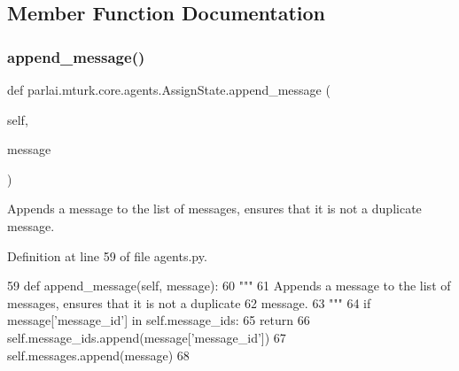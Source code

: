 \subsection{Member Function Documentation}
\mbox{\label{classparlai_1_1mturk_1_1core_1_1agents_1_1AssignState_a655ebb0e19f6a1b66416848bc2abca27}} 
\subsubsection{\texorpdfstring{append\+\_\+message()}{append\_message()}}
{\footnotesize\ttfamily def parlai.\+mturk.\+core.\+agents.\+Assign\+State.\+append\+\_\+message (\begin{DoxyParamCaption}\item[{}]{self,  }\item[{}]{message }\end{DoxyParamCaption})}

\begin{DoxyVerb}Appends a message to the list of messages, ensures that it is not a duplicate
message.
\end{DoxyVerb}
 

Definition at line 59 of file agents.\+py.


\begin{DoxyCode}
59     \textcolor{keyword}{def }append\_message(self, message):
60         \textcolor{stringliteral}{"""}
61 \textcolor{stringliteral}{        Appends a message to the list of messages, ensures that it is not a duplicate}
62 \textcolor{stringliteral}{        message.}
63 \textcolor{stringliteral}{        """}
64         \textcolor{keywordflow}{if} message[\textcolor{stringliteral}{'message\_id'}] \textcolor{keywordflow}{in} self.message\_ids:
65             \textcolor{keywordflow}{return}
66         self.message\_ids.append(message[\textcolor{stringliteral}{'message\_id'}])
67         self.messages.append(message)
68 
\end{DoxyCode}
\mbox{\label{classparlai_1_1mturk_1_1core_1_1agents_1_1AssignState_a6a683e69e6ba2fc0db6570a7af70d1c0}} 

